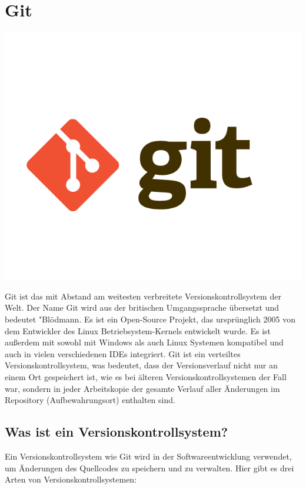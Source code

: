 \section{Git}
\includegraphics[scale=0.075]{pics/logos/gitLogo.png}

Git ist das mit Abstand am weitesten verbreitete Versionskontrollsystem der Welt. Der Name Git wird aus der britischen 
Umgangssprache übersetzt und bedeutet "Blödmann.
\cite{sysarch-git-1}
Es ist ein Open-Source Projekt, 
das ursprünglich 2005 von dem Entwickler des Linux Betriebsystem-Kernels entwickelt wurde. Es ist außerdem mit sowohl mit 
Windows als auch Linux Systemen kompatibel und auch in vielen verschiedenen IDEs integriert. Git ist ein verteiltes Versionskontrollsystem, 
was bedeutet, dass der Versionsverlauf nicht nur an einem Ort gespeichert ist, wie es bei älteren Versionskontrollsystemen der Fall war, 
sondern in jeder Arbeitskopie der gesamte Verlauf aller Änderungen im Repository (Aufbewahrungsort) enthalten sind. 

\cite{sysarch-git-2}

\subsection{Was ist ein Versionskontrollsystem?}

Ein Versionskontrollsystem wie Git wird in der Softwareentwicklung verwendet, 
um Änderungen des Quellcodes zu speichern und zu verwalten. 
Hier gibt es drei Arten von Versionskontrollsystemen:
\cite{sysarch-git-2}

